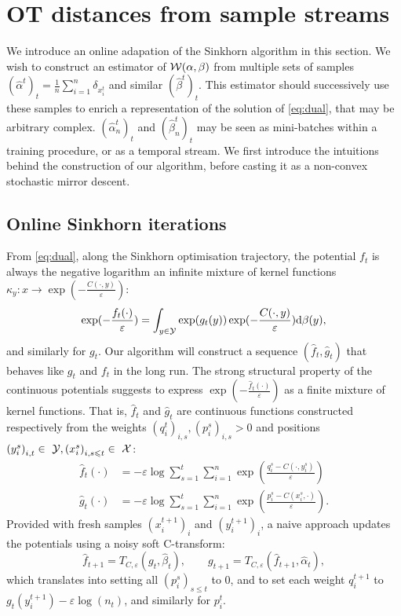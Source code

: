 
\section{OT distances from sample streams}

We introduce an online adapation of the Sinkhorn algorithm in this section. We
wish to construct an estimator of $\mathcal{W}(\alpha,\beta)$ from multiple sets of
samples $(\hat \alpha^t)_t = \frac{1}{n} \sum_{i=1}^n \delta_{x_i^t}$
 and similar $(\hat \beta^t)_t$. This estimator should
successively use these samples to enrich a representation of the solution of
\eqref{eq:dual}, that may be arbitrary complex. $(\hat \alpha_n^t)_t$ and $(\hat
\beta_n^t)_t$ may be seen as mini-batches within a training procedure, or as a
temporal stream. We first introduce the intuitions behind the construction of
our algorithm, before casting it as a non-convex stochastic mirror descent.

\subsection{Online Sinkhorn iterations}

From \eqref{eq:dual}, along the Sinkhorn optimisation trajectory, the potential $f_t$ is always the negative logarithm an
infinite mixture of kernel functions $\kappa_y: x \to \exp(-\frac{C(\cdot, y)}{\varepsilon})$:
\begin{equation}
    \exp(-\frac{f_t(\cdot)}{\varepsilon}) = 
    \int_{y \in \mathcal{Y}} \exp(g_t(y))  \exp(-\frac{C(\cdot, y)}{\varepsilon}) \textrm{d} \beta(y),
\end{equation}
and similarly for $g_t$. Our algorithm will construct a sequence $(\hat f_t,
\hat g_t)$ that behaves like $g_t$ and $f_t$ in the long run. The strong
structural property of the continuous potentials suggests to express $\exp(-\frac{\hat f_t(\cdot)}{\varepsilon})$ as a
finite mixture of kernel functions. That is, $\hat f_t$ and $\hat g_t$ are continuous
functions constructed respectively from the weights ${(q_i^t)}_{i,s}, {(p_i^s)}_{i,s} > 0$ and positions
${(y_i^s)}_{i,t} \in~\mathcal{Y}, {(x_i^s)}_{i,s\leqslant t} \in~\mathcal{X}$:
\begin{align}\label{eq:param}
    \hat f_t(\cdot) &= - \varepsilon \log \sum_{s=1}^t \sum_{i=1}^{n} 
    \exp(\frac{q_i^s - C(\cdot, y_i^s)}{\varepsilon}) \\
    \hat g_t(\cdot) &= - \varepsilon \log \sum_{s=1}^t \sum_{i=1}^{n} 
    \exp(\frac{p_i^s - C(x_i^s, \cdot)}{\varepsilon}).
\end{align}
Provided with fresh samples $(x_i^{t+1})_i$ and $(y_i^{t+1})_i$, a naive approach
 updates the potentials using a noisy soft C-transform:
\begin{equation}
    \hat f_{t+1} = T_{C,\varepsilon}(g_t, \hat \beta_t),\qquad g_{t+1} = T_{C,\varepsilon}(\hat f_{t+1}, \hat \alpha_t),
\end{equation}
which translates into setting all $(p_i^s)_{s \leq t}$ to 0, and to set each weight
 $q_i^{t+1}$ to $g_t(y_i^{t+1}) - \varepsilon \log(n_t)$, and similarly for $p_i^t$.

